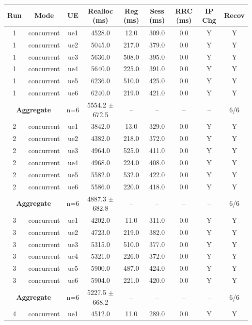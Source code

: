 \begin{table}[ht]
\centering
\begin{tabular}{|c|c|c|c|c|c|c|c|c|}
\hline
Run & Mode & UE & Realloc (ms) & Reg (ms) & Sess (ms) & RRC (ms) & IP Chg & Recov \\
\hline
1 & concurrent & ue1 & 4528.0 & 12.0 & 309.0 & 0.0 & Y & Y \\
1 & concurrent & ue2 & 5045.0 & 217.0 & 379.0 & 0.0 & Y & Y \\
1 & concurrent & ue3 & 5636.0 & 508.0 & 395.0 & 0.0 & Y & Y \\
1 & concurrent & ue4 & 5640.0 & 225.0 & 391.0 & 0.0 & Y & Y \\
1 & concurrent & ue5 & 6236.0 & 510.0 & 425.0 & 0.0 & Y & Y \\
1 & concurrent & ue6 & 6240.0 & 219.0 & 421.0 & 0.0 & Y & Y \\
\multicolumn{2}{|c|}{\textbf{Aggregate}} & n=6 & 5554.2 $\pm$ 672.5 & -- & -- & -- & -- & 6/6 \\
\hline
2 & concurrent & ue1 & 3842.0 & 13.0 & 329.0 & 0.0 & Y & Y \\
2 & concurrent & ue2 & 4382.0 & 218.0 & 372.0 & 0.0 & Y & Y \\
2 & concurrent & ue3 & 4964.0 & 525.0 & 411.0 & 0.0 & Y & Y \\
2 & concurrent & ue4 & 4968.0 & 224.0 & 408.0 & 0.0 & Y & Y \\
2 & concurrent & ue5 & 5582.0 & 532.0 & 422.0 & 0.0 & Y & Y \\
2 & concurrent & ue6 & 5586.0 & 220.0 & 418.0 & 0.0 & Y & Y \\
\multicolumn{2}{|c|}{\textbf{Aggregate}} & n=6 & 4887.3 $\pm$ 682.8 & -- & -- & -- & -- & 6/6 \\
\hline
3 & concurrent & ue1 & 4202.0 & 11.0 & 311.0 & 0.0 & Y & Y \\
3 & concurrent & ue2 & 4723.0 & 219.0 & 382.0 & 0.0 & Y & Y \\
3 & concurrent & ue3 & 5315.0 & 510.0 & 377.0 & 0.0 & Y & Y \\
3 & concurrent & ue4 & 5321.0 & 226.0 & 372.0 & 0.0 & Y & Y \\
3 & concurrent & ue5 & 5900.0 & 487.0 & 424.0 & 0.0 & Y & Y \\
3 & concurrent & ue6 & 5904.0 & 221.0 & 420.0 & 0.0 & Y & Y \\
\multicolumn{2}{|c|}{\textbf{Aggregate}} & n=6 & 5227.5 $\pm$ 668.2 & -- & -- & -- & -- & 6/6 \\
\hline
4 & concurrent & ue1 & 4512.0 & 11.0 & 289.0 & 0.0 & Y & Y \\

\end{tabular}
\end{table}
